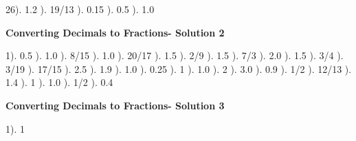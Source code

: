 \documentclass{article}%
\begin{document}
26). 1.2%
). 19/13%
). 0.15%
). 0.5%
). 1.0%
\newline%
\newpage%
\large%
\begin{center}%
\textbf{Converting Decimals to Fractions- Solution 2}%
\newline%
\end{center} \normalsize%
1). 0.5%
). 1.0%
). 8/15%
). 1.0%
). 20/17%
). 1.5%
). 2/9%
). 1.5%
). 7/3%
). 2.0%
). 1.5%
). 3/4%
). 3/19%
). 17/15%
). 2.5%
). 1.9%
). 1.0%
). 0.25%
). 1%
). 1.0%
). 2%
). 3.0%
). 0.9%
). 1/2%
). 12/13%
). 1.4%
). 1%
). 1.0%
). 1/2%
). 0.4%
\newline%
\newpage%
\large%
\begin{center}%
\textbf{Converting Decimals to Fractions- Solution 3}%
\newline%
\end{center} \normalsize%
1). 1%
\newline%
\end{document}
